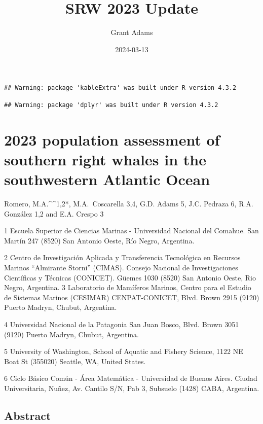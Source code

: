 \documentclass[
]{article}
\title{SRW 2023 Update}
\author{Grant Adams}
\date{2024-03-13}
\begin{document}
\maketitle

\begin{verbatim}
## Warning: package 'kableExtra' was built under R version 4.3.2
\end{verbatim}

\begin{verbatim}
## Warning: package 'dplyr' was built under R version 4.3.2
\end{verbatim}

\hypertarget{population-assessment-of-southern-right-whales-in-the-southwestern-atlantic-ocean}{%
\section{2023 population assessment of southern right whales in the
southwestern Atlantic
Ocean}\label{population-assessment-of-southern-right-whales-in-the-southwestern-atlantic-ocean}}

Romero, M.A.\^{}\^{}1,2*, M.A.~Coscarella 3,4, G.D. Adams 5, J.C.
Pedraza 6, R.A. González 1,2 and E.A. Crespo 3

1 Escuela Superior de Ciencias Marinas - Universidad Nacional del
Comahue. San Martín 247 (8520) San Antonio Oeste, Río Negro, Argentina.

2 Centro de Investigación Aplicada y Transferencia Tecnológica en
Recursos Marinos ``Almirante Storni'' (CIMAS). Consejo Nacional de
Investigaciones Científicas y Técnicas (CONICET). Güemes 1030 (8520) San
Antonio Oeste, Rio Negro, Argentina. 3 Laboratorio de Mamíferos Marinos,
Centro para el Estudio de Sistemas Marinos (CESIMAR) CENPAT-CONICET,
Blvd. Brown 2915 (9120) Puerto Madryn, Chubut, Argentina.

4 Universidad Nacional de la Patagonia San Juan Bosco, Blvd. Brown 3051
(9120) Puerto Madryn, Chubut, Argentina.

5 University of Washington, School of Aquatic and Fishery Science, 1122
NE Boat St (355020) Seattle, WA, United States.

6 Ciclo Básico Común - Área Matemática - Universidad de Buenos Aires.
Ciudad Universitaria, Nuñez, Av. Cantilo S/N, Pab 3, Subsuelo (1428)
CABA, Argentina.

\hypertarget{abstract}{%
\subsection{Abstract}\label{abstract}}
\end{document}
